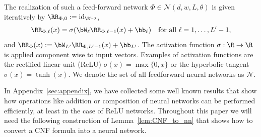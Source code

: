 \documentclass{amsart}[11pt]
\numberwithin{equation}{section}
\newcommand{\nn}{\mathcal{N}}
\newcommand{\relu}{\sigma}
\newcommand{\identity}{\rm id}
\numberwithin{theorem}{section}
\begin{document}
The realization of such a feed-forward network $\Phi \in \nn(d,w,L,\theta)$ is given iteratively by  $\RR_{\Phi, 0}:= {\identity}_{\R^{w_0}}$,
\begin{align*}
\RR_{\Phi, \ell}(x) = \relu(\bW_{\ell}\RR_{\Phi, \ell-1}(x)+ \bb_{\ell})\quad\text{for all }\ell=1,\ldots,L'-1,
\end{align*}
and $\RR_\Phi(x):=\bW_{L'} \RR_{\Phi, L'-1}(x) + \bb_{L'}$. The activation function $\sigma: \R\to \R$ is applied component wise to input vectors. Examples of activation functions are the rectified linear unit (ReLU) $\relu(x) = \max\{0, x\}$ or the hyperbolic tangent $\sigma(x) = \tanh(x)$. We denote the set of all feedforward neural networks as $\nn$. 


In Appendix~\ref{sec:appendix}, we have collected some well known results that show how operations like addition or composition of neural networks can be performed efficiently, at least in the case of ReLU networks. Throughout this paper we will need the following construction of Lemma~\ref{lem:CNF_to_nn} that shows how to convert a CNF formula into a neural network.
\end{document}

